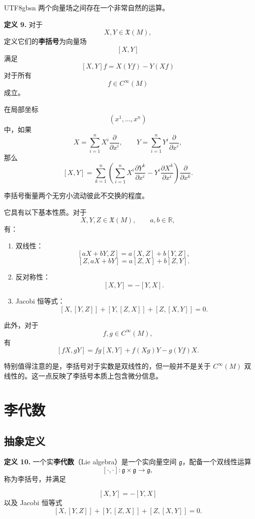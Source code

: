 \documentclass[11pt]{article}
\begin{document}
\begin{CJK*}{UTF8}{gbsn}
两个向量场之间存在一个非常自然的运算。

\textbf{定义 9.}
对于
\[
X,Y\in\mathfrak{X}(M),
\]
定义它们的\textbf{李括号}为向量场
\[
[X,Y]
\]
满足
\[
[X,Y]f
=
X(Yf)-Y(Xf)
\]
对于所有
\[
f\in C^\infty(M)
\]
成立。

在局部坐标
\[
(x^1,\ldots,x^n)
\]
中，如果
\[
X
=
\sum_{i=1}^{n}
X^i\frac{\partial}{\partial x^i},
\qquad
Y
=
\sum_{i=1}^{n}
Y^i\frac{\partial}{\partial x^i},
\]
那么
\[
[X,Y]
=
\sum_{k=1}^{n}
\left(
\sum_{i=1}^{n}
X^i\frac{\partial Y^k}{\partial x^i}
-
Y^i\frac{\partial X^k}{\partial x^i}
\right)
\frac{\partial}{\partial x^k}.
\]

李括号衡量两个无穷小流动彼此不交换的程度。

它具有以下基本性质。对于
\[
X,Y,Z\in\mathfrak{X}(M),
\qquad
a,b\in\mathbb{R},
\]
有：

\begin{enumerate}
    \item 双线性：
    \[
    [aX+bY,Z]
    =
    a[X,Z]+b[Y,Z],
    \]
    \[
    [Z,aX+bY]
    =
    a[Z,X]+b[Z,Y].
    \]

    \item 反对称性：
    \[
    [X,Y]=-[Y,X].
    \]

    \item Jacobi 恒等式：
    \[
    [X,[Y,Z]]
    +
    [Y,[Z,X]]
    +
    [Z,[X,Y]]
    =
    0.
    \]
\end{enumerate}

此外，对于
\[
f,g\in C^\infty(M),
\]
有
\[
[fX,gY]
=
fg[X,Y]
+
f(Xg)Y
-
g(Yf)X.
\]

特别值得注意的是，李括号对于实数是双线性的，但一般并不是关于 $C^\infty(M)$ 双线性的。这一点反映了李括号本质上包含微分信息。


\section{李代数}

\subsection{抽象定义}

\textbf{定义 10.}
一个实\textbf{李代数}（Lie algebra）是一个实向量空间 $\mathfrak{g}$，配备一个双线性运算
\[
[\cdot,\cdot]:
\mathfrak{g}\times\mathfrak{g}
\to
\mathfrak{g},
\]
称为李括号，并满足

\[
[X,Y]=-[Y,X]
\]
以及 Jacobi 恒等式
\[
[X,[Y,Z]]
+
[Y,[Z,X]]
+
[Z,[X,Y]]
=
0.
\]


\end{CJK*}
\end{document}
